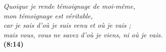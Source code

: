 \newpage
\mbox{}
\vfill


\begin{myverse}
{\itshape
\Og{}Quoique je rende témoignage de moi-même, \\
 mon témoignage est véritable, \\
 car je sais d’où je suis venu et où je vais ; \\
 mais vous, vous ne savez d’où je viens, ni où je vais.\Fg{} \\[5mm]
}
\myversereffont\bfseries\scshape {}(8:14)
\end{myverse}
\vfill
\mbox{}
\newpage
